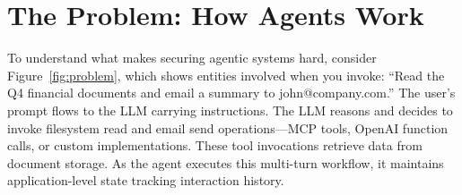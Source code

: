 \section{The Problem: How Agents Work}
\label{sec:problem}

To understand what makes securing agentic systems hard, consider Figure~\ref{fig:problem}, which shows entities involved when you invoke: ``Read the Q4 financial documents and email a summary to john@company.com.'' The user's prompt flows to the LLM carrying instructions. The LLM reasons and decides to invoke filesystem read and email send operations—MCP tools, OpenAI function calls, or custom implementations. These tool invocations retrieve data from document storage. As the agent executes this multi-turn workflow, it maintains application-level state tracking interaction history.

